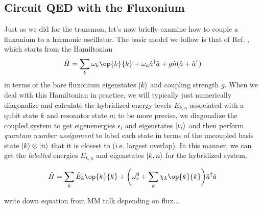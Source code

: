 \subsection{Circuit QED with the Fluxonium}

Just as we did for the transmon, let's now briefly examine how to couple a fluxonium to a harmonic oscillator. The basic model we follow is that of Ref. \cite{zhu2013cQEDfluxonium}, which starts from the Hamiltonian
\begin{equation}
    \hat{H} = \sum_k \omega_k \op{k}{k} + \omega_a \hat{a}^\dagger\hat{a} + g\hat{n}(\hat{a} + \hat{a}^\dagger)
\end{equation}
in terms of the bare fluxonium eigenstates $\lvert k\rangle$ and coupling strength $g$. When we deal with this Hamiltonian in practice, we will typically just numerically diagonalize and calculate the hybridized energy levels $E_{k, n}$ associated with a qubit state $k$ and resonator state $n$; to be more precise, we diagonalize the coupled system to get eigenenergies $\epsilon_i$ and eigenstates $\lvert v_i\rangle$ and then perform \textit{quantum number assignment} to label each state in terms of the uncoupled basis state $\lvert k\rangle\otimes\lvert n\rangle$ that it is closest to (i.e. largest overlap). In this manner, we can get the \textit{labelled} energies $E_{k, n}$ and eigenstates $\lvert k, n\rangle$ for the hybridized system. 








\begin{equation}
    \hat{H} = \sum_k \tilde{E}_k \op{k}{k} + \bigg(\omega_r^0 + \sum_k \chi_k \op{k}{k}\bigg) \hat{a}^\dagger\hat{a}
\end{equation}



write down equation from MM talk depending on flux... 